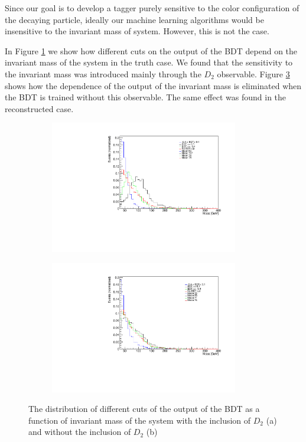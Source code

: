 \documentclass[10pt,a4paper]{book}
\begin{document}
Since our goal is to develop a tagger purely sensitive to the color configuration of the decaying particle, ideally our machine learning algorithms would be insensitive to the invariant mass of system. However, this is not the case.

In Figure \ref{bdt with d2} we show how different cuts on the output of the BDT depend on the invariant mass of the system in the truth case. We found that the sensitivity to the invariant mass was introduced mainly through the $D_2$ observable. Figure \ref{bdt w/o d2} shows how the dependence of the output of the invariant mass is eliminated when the BDT is trained without this observable. The same effect was found in the reconstructed case.

\begin{figure}[h]
\begin{subfigure}{1.0\textwidth}
\centering
\includegraphics[width=0.9\textwidth]{ch4_images/bdt_with_d2_included}
\caption{}
\label{bdt with d2}
\end{subfigure}
\begin{subfigure}{1.0\textwidth}
\centering
\includegraphics[width=0.9\textwidth]{ch4_images/bdt_no_d2}
\caption{}
\label{bdt w/o d2}
\end{subfigure}
\caption{The distribution of different cuts of the output of the BDT as a function of invariant mass of the system with the inclusion of $D_2$ (a) and without the inclusion of $D_2$ (b)}
\end{figure} 
\end{document}
